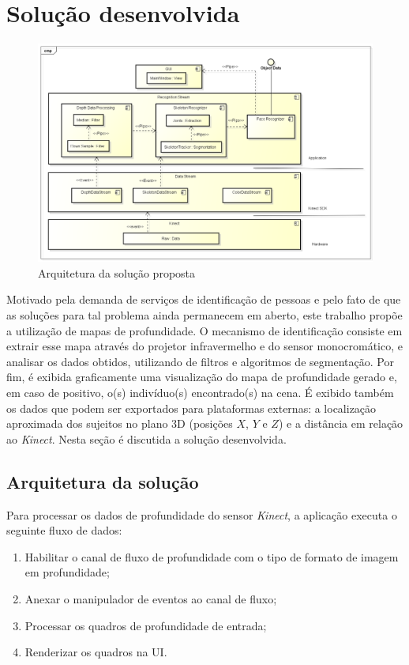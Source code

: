 \section{Solução desenvolvida}\label{sec:solucao-desenvolvida}

\begin{figure}[ht]
\centering
\includegraphics[width=1.0\textwidth]{images/Arquitetura_da_solucao.png}
\caption{Arquitetura da solução proposta}
\label{fig:visao-geral}
\end{figure}

Motivado pela demanda de serviços de identificação de pessoas e pelo fato de que as soluções para tal problema ainda permanecem em aberto, este trabalho propõe a utilização de mapas de profundidade. O mecanismo de identificação consiste em extrair esse mapa através do projetor infravermelho e do sensor monocromático, e analisar os dados obtidos, utilizando de filtros e algoritmos de segmentação. Por fim, é exibida graficamente uma visualização do mapa de profundidade gerado e, em caso de positivo, o(s) indivíduo(s) encontrado(s) na cena. É exibido também os dados que podem ser exportados para plataformas externas: a localização aproximada dos sujeitos no plano 3D (posições $X$, $Y$ e $Z$) e a distância em relação ao \textit{Kinect}. Nesta seção é discutida a solução desenvolvida.

\subsection{Arquitetura da solução}\label{sec:arqSol}
Para processar os dados de profundidade do sensor \textit{Kinect}, a aplicação executa o seguinte fluxo de dados:

\begin{enumerate}
    \item Habilitar o canal de fluxo de profundidade com o tipo de formato de imagem em profundidade; 
    \item Anexar o manipulador de eventos ao canal de fluxo; 
    \item Processar os quadros de profundidade de entrada; 
    \item Renderizar os quadros na UI.
\end{enumerate}

